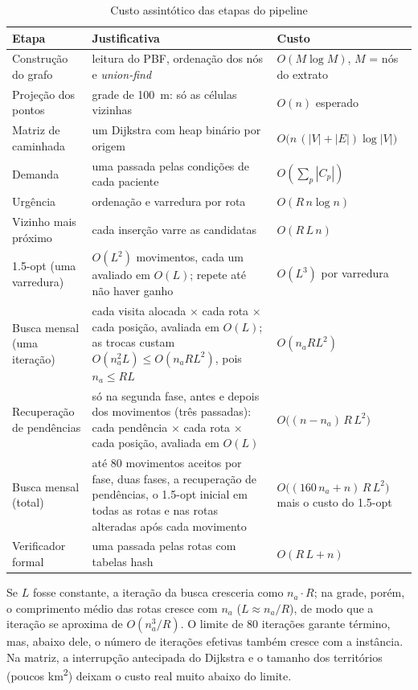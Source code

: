 \documentclass[11pt,a4paper]{article}
\begin{document}
\begin{table}[ht]
\centering
\caption{Custo assintótico das etapas do pipeline}
\label{tab:complexidade}
\small
\begin{tabularx}{\textwidth}{@{}lXl@{}}
\toprule
\textbf{Etapa} & \textbf{Justificativa} & \textbf{Custo} \\
\midrule
Construção do grafo & leitura do PBF, ordenação dos nós e \emph{union-find} & $O(M \log M)$, $M$ = nós do extrato \\
Projeção dos pontos & grade de 100~m: só as células vizinhas & $O(n)$ esperado \\
Matriz de caminhada & um Dijkstra com heap binário por origem~\cite{cormen} & $O\bigl(n\,(|V|+|E|)\log |V|\bigr)$ \\
Demanda & uma passada pelas condições de cada paciente & $O(\sum_p |C_p|)$ \\
Urgência & ordenação e varredura por rota & $O(R\, n \log n)$ \\
Vizinho mais próximo & cada inserção varre as candidatas & $O(R\, L\, n)$ \\
1.5-opt (uma varredura) & $O(L^2)$ movimentos, cada um avaliado
em $O(L)$; repete até não haver ganho & $O(L^3)$ por varredura \\
Busca mensal (uma iteração) & cada visita alocada $\times$ cada rota
$\times$ cada posição, avaliada em $O(L)$; as trocas custam
$O(n_a^2 L) \le O(n_a R L^2)$, pois $n_a \le RL$
& $O(n_a R L^2)$ \\
Recuperação de pendências & só na segunda fase, antes e depois
dos movimentos (três passadas): cada pendência $\times$ cada rota
$\times$ cada posição, avaliada em $O(L)$ & $O\bigl((n-n_a)\, R\, L^2\bigr)$ \\
Busca mensal (total) & até 80 movimentos aceitos por fase, duas
fases, a recuperação de pendências, o 1.5-opt inicial em todas as
rotas e nas rotas alteradas após cada movimento & $O\bigl((160\,
n_a + n)\, R\, L^2\bigr)$ mais o custo do 1.5-opt \\
Verificador formal & uma passada pelas rotas com tabelas hash & $O(R\,L + n)$ \\
\bottomrule
\end{tabularx}
\end{table}

Se $L$ fosse constante, a iteração da busca cresceria como $n_a \cdot R$; na grade, porém, o comprimento médio das rotas cresce com $n_a$ ($L \approx n_a/R$), de modo que a iteração se aproxima de $O(n_a^3/R)$. O limite de 80 iterações garante término, mas, abaixo dele, o número de iterações efetivas também cresce com a instância. Na matriz, a interrupção antecipada do Dijkstra e o tamanho dos territórios (poucos km\textsuperscript{2}) deixam o custo real muito abaixo do limite.
\end{document}
